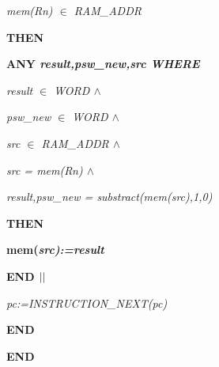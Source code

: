 \begin{sloppypar}
\hspace*{0.20in}\it mem\rm (\it Rn\rm ) $\in$  \it RAM\_ADDR

\hspace*{0.10in}\bf THEN

\hspace*{0.20in}\bf ANY \it result\rm ,\it psw\_new\rm ,\it src \bf WHERE

\hspace*{0.30in}\it result $\in$  \it WORD  $\land$ 

\hspace*{0.30in}\it psw\_new $\in$  \it WORD  $\land$ 

\hspace*{0.30in}\it src $\in$  \it RAM\_ADDR  $\land$ 

\hspace*{0.30in}\it src \rm = \it mem\rm (\it Rn\rm )  $\land$ 

\hspace*{0.30in}\it result\rm ,\it psw\_new \rm = \it substract\rm (\it mem\rm (\it src\rm )\rm ,\rm 1\rm ,\rm 0\rm )

\hspace*{0.20in}\bf THEN

\hspace*{0.30in}\bf mem\rm (\it src\rm )\rm :=\it result

\hspace*{0.20in}\bf END  $\mbox{$\mid\mid$}$ 

\hspace*{0.20in}\it pc\rm :=\it INSTRUCTION\_NEXT\rm (\it pc\rm )

\hspace*{0.10in}\bf END

\bf END

\newpage
\end{sloppypar}
